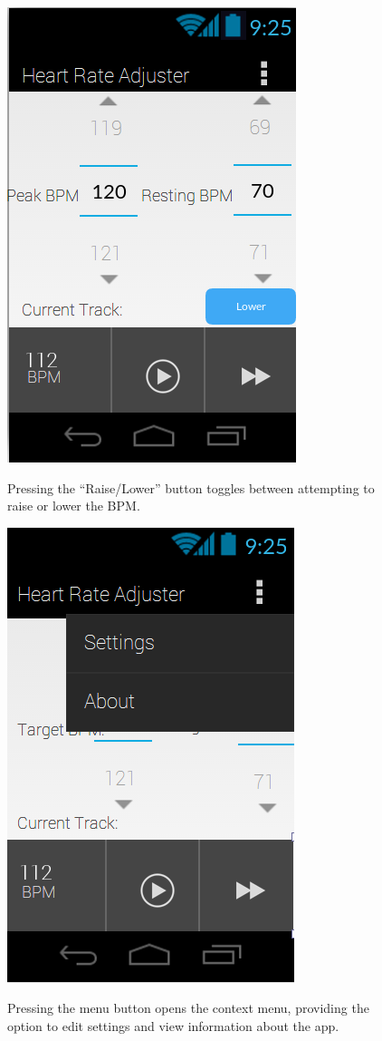 \documentclass[letterpaper,english, 12pt]{scrreprt}
\begin{document}
\begin{figure}[H]
	\centering
	\includegraphics{img/mobile_ui/2.png}\\
	\caption{Pressing the ``Raise/Lower'' button toggles between attempting to raise or lower the BPM.}
\end{figure}

\begin{figure}[H]
	\centering
	\includegraphics{img/mobile_ui/3.png}\\
	\caption{Pressing the menu button opens the context menu, providing the option to edit settings and view information about the app.}
\end{figure}
\end{document}
